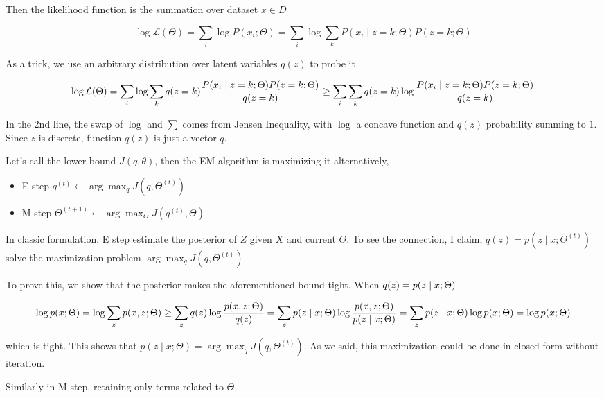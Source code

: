 \documentclass[
]{article}
\providecommand{\tightlist}{%
  \setlength{\itemsep}{0pt}\setlength{\parskip}{0pt}}
\begin{document}
Then the likelihood function is the summation over dataset \(x\in D\)

\[
\log\mathcal L(\Theta)=\sum_i \log P(x_i;\Theta)=\sum_i \log \sum_k P(x_i\mid z=k;\Theta)P(z=k;\Theta)
\]

As a trick, we use an arbitrary distribution over latent variables
\(q(z)\) to probe it

\[
\log\mathcal L(\Theta)=\sum_i \log \sum_k q(z=k)\frac{ P(x_i\mid z=k;\Theta)P(z=k;\Theta)}{q(z=k)}\\
\geq\sum_i \sum_k q(z=k) \log \frac{ P(x_i\mid z=k;\Theta)P(z=k;\Theta)}{q(z=k)}
\]

In the 2nd line, the swap of \(\log\) and \(\sum\) comes from Jensen
Inequality, with \(\log\) a concave function and \(q(z)\) probability
summing to \(1\). Since \(z\) is discrete, function \(q(z)\) is just a
vector \(q\).

Let's call the lower bound \(J(q,\theta)\), then the EM algorithm is
maximizing it alternatively,

\begin{itemize}
\tightlist
\item
  E step \(q^{(t)}\gets \arg\max_q J(q,\Theta^{(t)})\)
\item
  M step \(\Theta^{(t+1)}\gets \arg\max_\Theta J(q^{(t)},\Theta)\)
\end{itemize}

In classic formulation, E step estimate the posterior of \(Z\) given
\(X\) and current \(\Theta\). To see the connection, I claim,
\(q(z)=p(z\mid x;\Theta^{(t)})\) solve the maximization problem
\(\arg\max_q J(q,\Theta^{(t)})\).

To prove this, we show that the posterior makes the aforementioned bound
tight. When \(q(z)=p(z\mid x;\Theta)\\\)

\[
\log p(x;\Theta) = \log \sum_z p(x,z;\Theta) \\
\geq \sum_z q(z)\log \frac{p(x,z;\Theta)}{q(z)}\\
=\sum_z p(z\mid x;\Theta) \log \frac{p(x,z;\Theta)}{p(z\mid x;\Theta)} \\
=\sum_z p(z\mid x;\Theta) \log p(x;\Theta)\\
=\log p(x;\Theta)
\]

which is tight. This shows that
\(p(z\mid x;\Theta)=\arg\max_q J(q,\Theta^{(t)})\). As we said, this
maximization could be done in closed form without iteration.

Similarly in M step, retaining only terms related to \(\Theta\)
\end{document}
